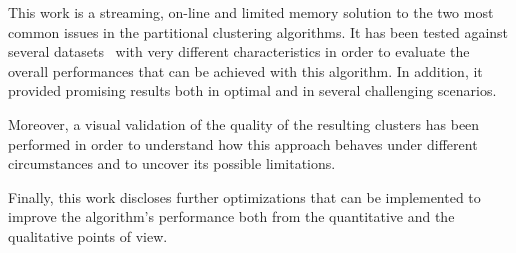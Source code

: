 This work is a streaming, on-line and limited memory solution to the two most common
issues in the partitional clustering algorithms.
It has been tested against several datasets~\cite{ClusteringDatasets} with
very different characteristics in order to evaluate the overall performances that
can be achieved with this algorithm.
In addition, it provided promising results both in optimal and in several challenging
scenarios.

Moreover, a visual validation of the quality of the resulting clusters has
been performed in order to understand how this approach behaves under different
circumstances and to uncover its possible limitations.

Finally, this work discloses further optimizations that can be implemented to
improve the algorithm's performance both from the quantitative and the qualitative
points of view.
